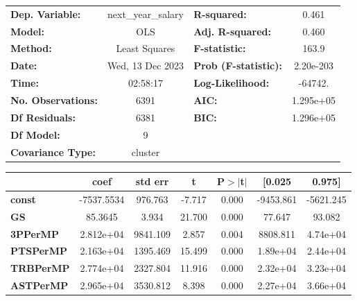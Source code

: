 \begin{center}
\begin{tabular}{lclc}
\toprule
\textbf{Dep. Variable:}    & next\_year\_salary & \textbf{  R-squared:         } &     0.461   \\
\textbf{Model:}            &        OLS         & \textbf{  Adj. R-squared:    } &     0.460   \\
\textbf{Method:}           &   Least Squares    & \textbf{  F-statistic:       } &     163.9   \\
\textbf{Date:}             &  Wed, 13 Dec 2023  & \textbf{  Prob (F-statistic):} & 2.20e-203   \\
\textbf{Time:}             &      02:58:17      & \textbf{  Log-Likelihood:    } &   -64742.   \\
\textbf{No. Observations:} &         6391       & \textbf{  AIC:               } & 1.295e+05   \\
\textbf{Df Residuals:}     &         6381       & \textbf{  BIC:               } & 1.296e+05   \\
\textbf{Df Model:}         &            9       & \textbf{                     } &             \\
\textbf{Covariance Type:}  &      cluster       & \textbf{                     } &             \\
\bottomrule
\end{tabular}
\begin{tabular}{lcccccc}
                       & \textbf{coef} & \textbf{std err} & \textbf{t} & \textbf{P$> |$t$|$} & \textbf{[0.025} & \textbf{0.975]}  \\
\midrule
\textbf{const}         &   -7537.5534  &      976.763     &    -7.717  &         0.000        &    -9453.861    &    -5621.245     \\
\textbf{GS}            &      85.3645  &        3.934     &    21.700  &         0.000        &       77.647    &       93.082     \\
\textbf{3PPerMP}       &    2.812e+04  &     9841.109     &     2.857  &         0.004        &     8808.811    &     4.74e+04     \\
\textbf{PTSPerMP}      &    2.163e+04  &     1395.469     &    15.499  &         0.000        &     1.89e+04    &     2.44e+04     \\
\textbf{TRBPerMP}      &    2.774e+04  &     2327.804     &    11.916  &         0.000        &     2.32e+04    &     3.23e+04     \\
\textbf{ASTPerMP}      &    2.965e+04  &     3530.812     &     8.398  &         0.000        &     2.27e+04    &     3.66e+04     \\

\end{tabular}
\end{center}
